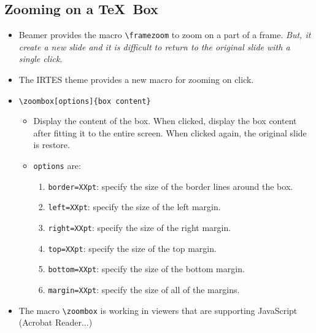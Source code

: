 \documentclass[english,circlenumberstyle]{irtesbeamer}
\begin{document}
\subsection{Zooming on a \TeX\ Box}
\begin{frame}{\subsecname}
	\begin{itemize}
	\item Beamer provides the macro \texttt{{\textbackslash}framezoom} to zoom on a part of a frame. \emph{But, it create a new slide and it is difficult to return to the original slide with a single click}.	
	\item The IRTES theme provides a new macro for zooming on click.
	\item \texttt{{\textbackslash}zoombox[options]\{box content\}}
		\begin{itemize}
		\item Display the content of the box. When clicked, display the box content after fitting it to the entire screen. When clicked again, the original slide is restore.
		\item \texttt{options} are:
			\begin{enumerate}
			\item \texttt{border=XXpt}: specify the size of the border lines around the box.
			\item \texttt{left=XXpt}: specify the size of the left margin.
			\item \texttt{right=XXpt}: specify the size of the right margin.
			\item \texttt{top=XXpt}: specify the size of the top margin.
			\item \texttt{bottom=XXpt}: specify the size of the bottom margin.
			\item \texttt{margin=XXpt}: specify the size of all of the margins.
			\end{enumerate}
		\end{itemize}
	\item \alert{The macro \texttt{{\textbackslash}zoombox} is working in viewers that are supporting JavaScript (Acrobat Reader...)}
	\end{itemize}
	\begin{center}
	\end{center}
\end{frame}
\end{document}
